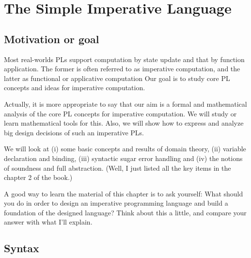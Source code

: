 \chapter{The Simple Imperative Language}

\section{Motivation or goal}

\begin{enumcirc}
	\item
	Most real-worlds PLs support computation by state update and that by function
	application.
	The former is often referred to as imperative computation, and the latter as
	functional or applicative computation
	Our goal is to study core PL concepts and ideas for imperative computation.
	\item
	Actually, it is more appropriate to say that our aim is a formal and
	mathematical analysis of the core PL concepts for imperative computation.
	We will study or learn mathematical tools for this.
	Also, we will show how to express and analyze big design decisions of such an
	imperative PLs.
	\item
	We will look at (i) some basic concepts and results of domain theory, (ii)
	variable declaration and binding, (iii) syntactic sugar error handling and (iv)
	the notions of soundness and full abstraction.%
	(Well, I just listed all the key items in the chapter 2 of the book.)
	\item
	A good way to learn the material of this chapter is to ask yourself:
	What should you do in order to design an imperative programming language and
	build a foundation of the designed language?
	Think about this a little, and compare your answer with what I'll explain.
\end{enumcirc}

\section{Syntax}

